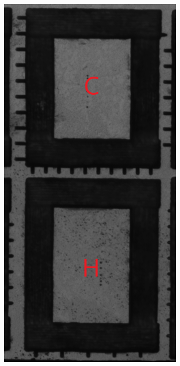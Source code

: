 \begin{refsection}
\begin{figure}[H]
    \centering
    \begin{subfigure}[b]{0.33\textwidth}
        \centering
        \includegraphics[width=\linewidth]{Chapter7/Figs/Raster/ch_narrow_pre_testing_esid.png}

\end{subfigure}
\end{figure}
\end{refsection}
